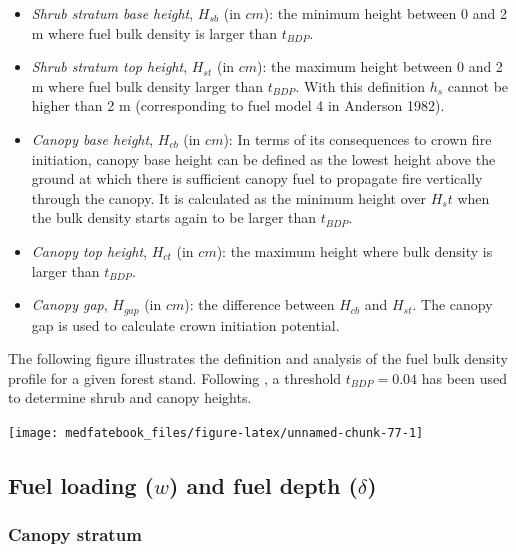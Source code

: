 \documentclass[]{book}
\providecommand{\tightlist}{%
  \setlength{\itemsep}{0pt}\setlength{\parskip}{0pt}}
\begin{document}
\begin{itemize}
\tightlist
\item
  \emph{Shrub stratum base height}, \(H_{sb}\) (in \(cm\)): the minimum height between 0 and 2 m where fuel bulk density is larger than \(t_{BDP}\).
\item
  \emph{Shrub stratum top height}, \(H_{st}\) (in \(cm\)): the maximum height between 0 and 2 m where fuel bulk density larger than \(t_{BDP}\). With this definition \(h_{s}\) cannot be higher than 2 m (corresponding to fuel model 4 in Anderson 1982).
\item
  \emph{Canopy base height}, \(H_{cb}\) (in \(cm\)): In terms of its consequences to crown fire initiation, canopy base height can be defined as the lowest height above the ground at which there is sufficient canopy fuel to propagate fire vertically through the canopy. It is calculated as the minimum height over \(H_st\) when the bulk density starts again to be larger than \(t_{BDP}\).
\item
  \emph{Canopy top height}, \(H_{ct}\) (in \(cm\)): the maximum height where bulk density is larger than \(t_{BDP}\).
\item
  \emph{Canopy gap}, \(H_{gap}\) (in \(cm\)): the difference between \(H_{cb}\) and \(H_{st}\). The canopy gap is used to calculate crown initiation potential.
\end{itemize}

The following figure illustrates the definition and analysis of the fuel bulk density profile for a given forest stand. Following \citet{Mitsopoulos2007}, a threshold \(t_{BDP} = 0.04\) has been used to determine shrub and canopy heights.

\begin{center}\texttt{[image: medfatebook\_files/figure-latex/unnamed-chunk-77-1]} \end{center}

\hypertarget{fuel-loading-w-and-fuel-depth-delta}{%
\subsection{\texorpdfstring{Fuel loading (\(w\)) and fuel depth (\(\delta\))}{Fuel loading (w) and fuel depth (\textbackslash{}delta)}}\label{fuel-loading-w-and-fuel-depth-delta}}

\hypertarget{canopy-stratum}{%
\subsubsection{Canopy stratum}\label{canopy-stratum}}
\end{document}
